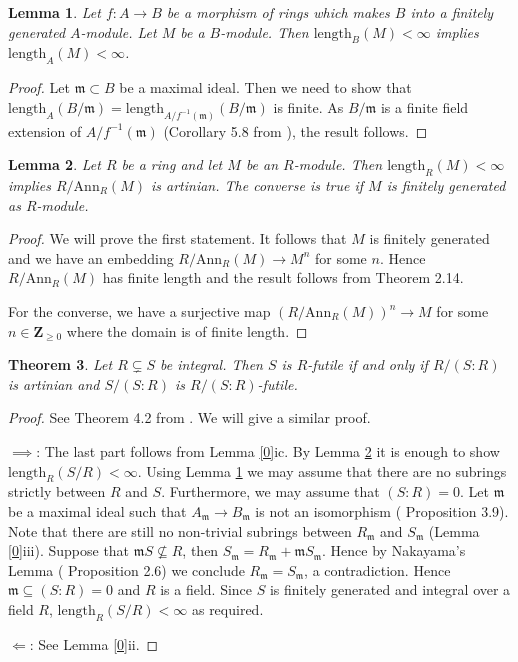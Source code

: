 \documentclass{amsart}
\theoremstyle{plain}
\newtheorem{theorem}{Theorem}[section]
\newtheorem{lemma}[theorem]{Lemma}
\theoremstyle{definition}
\begin{document}
\begin{lemma} \label{113}
Let $f: A \to B$ be a morphism of rings which makes $B$ into a finitely generated $A$-module. Let $M$ be a $B$-module. Then
$\mathrm{length}_B(M)<\infty$ implies
$\mathrm{length}_A(M)<\infty$. 
\end{lemma}
\begin{proof}
Let ${\mathfrak{m}} \subset B$ be a maximal ideal. Then we need to show that $\mathrm{length}_A(B/{\mathfrak{m}})=\mathrm{length}_{A/f^{-1}({\mathfrak{m}})}(B/{\mathfrak{m}})$ is finite. As $B/{\mathfrak{m}}$
is a finite field extension of $A/f^{-1}({\mathfrak{m}})$ (Corollary 5.8 from \cite{AT}), the result follows. 
\end{proof}

\begin{lemma} \label{114}
 Let $R$ be a ring and let $M$ be an $R$-module. Then $\mathrm{length}_R(M)<\infty$ implies $R/\mathrm{Ann}_R(M)$ is artinian. The converse is true
if $M$ is finitely generated as $R$-module.
\end{lemma}
\begin{proof}
We will prove the first statement. It follows that $M$ is finitely generated and we have an embedding $R/\mathrm{Ann}_R(M) \to M^n$ for some $n$.
Hence $R/\mathrm{Ann}_R(M)$ has finite length and the result follows from \cite{EI} Theorem 2.14. 

For the converse, we have a surjective map $(R/\mathrm{Ann}_R(M))^n \to M$ for some $n \in {\mathbf{Z}}_{\geq 0}$ where the domain is of finite length. 
\end{proof}

\begin{theorem} \label{111}
Let $R \subsetneq S$ be integral. Then $S$ is $R$-futile if and only if $R/(S:R)$ is artinian and $S/(S:R)$ is $R/(S:R)$-futile.
\end{theorem}
\begin{proof}
 See Theorem 4.2 from \cite{DO5}. We will give a similar proof.

$\implies$: The last part follows from Lemma \ref{0}ic. By Lemma \ref{114} it is enough to show $\mathrm{length}_R(S/R)<\infty$. Using Lemma
\ref{113} we may assume
that there
are no subrings strictly between $R$ and $S$. Furthermore, we may assume that $(S:R)=0$. 
Let ${\mathfrak{m}}$ be a maximal ideal such that $A_{\mathfrak{m}}\to B_{\mathfrak{m}}$ is not an isomorphism (\cite{AT} Proposition 3.9). Note that there are still no non-trivial
subrings between
$R_{\mathfrak{m}}$ and $S_{\mathfrak{m}}$ (Lemma \ref{0}iii). Suppose that ${\mathfrak{m}} S
\not \subseteq R$, then $S_{\mathfrak{m}}=R_{\mathfrak{m}}+{\mathfrak{m}} S_{\mathfrak{m}}$. Hence by Nakayama's Lemma (\cite{AT} Proposition 2.6) we conclude $R_{\mathfrak{m}}=S_{\mathfrak{m}}$, a
contradiction. Hence ${\mathfrak{m}} \subseteq (S:R)=0$ and $R$ is a field. Since $S$ is finitely generated and integral over a field $R$,
$\mathrm{length}_R(S/R)<\infty$ as required. 

${\Longleftarrow}$: See Lemma \ref{0}ii. 

\end{proof}
\end{document}
